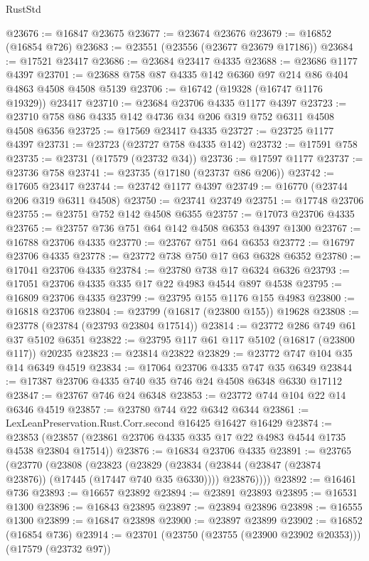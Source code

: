 \begin{lexlean}{RustStd}
\begin{coremodule}
@23676 := @16847 @23675
@23677 := @23674 @23676
@23679 := @16852 (@16854 @726)
@23683 := @23551 (@23556 (@23677 @23679 @17186))
@23684 := @17521 @23417
@23686 := @23684 @23417 @4335
@23688 := @23686 @1177 @4397
@23701 := @23688 @758 @87 @4335 @142 @6360 @97 @214 @86 @404 @4863 @4508 @4508 @5139
@23706 := @16742 (@19328 (@16747 @1176 @19329)) @23417
@23710 := @23684 @23706 @4335 @1177 @4397
@23723 := @23710 @758 @86 @4335 @142 @4736 @34 @206 @319 @752 @6311 @4508 @4508 @6356
@23725 := @17569 @23417 @4335
@23727 := @23725 @1177 @4397
@23731 := @23723 (@23727 @758 @4335 @142)
@23732 := @17591 @758
@23735 := @23731 (@17579 (@23732 @34))
@23736 := @17597 @1177
@23737 := @23736 @758
@23741 := @23735 (@17180 (@23737 @86 @206))
@23742 := @17605 @23417
@23744 := @23742 @1177 @4397
@23749 := @16770 (@23744 @206 @319 @6311 @4508)
@23750 := @23741 @23749
@23751 := @17748 @23706
@23755 := @23751 @752 @142 @4508 @6355
@23757 := @17073 @23706 @4335
@23765 := @23757 @736 @751 @64 @142 @4508 @6353 @4397 @1300
@23767 := @16788 @23706 @4335
@23770 := @23767 @751 @64 @6353
@23772 := @16797 @23706 @4335
@23778 := @23772 @738 @750 @17 @63 @6328 @6352
@23780 := @17041 @23706 @4335
@23784 := @23780 @738 @17 @6324 @6326
@23793 := @17051 @23706 @4335 @335 @17 @22 @4983 @4544 @897 @4538
@23795 := @16809 @23706 @4335
@23799 := @23795 @155 @1176 @155 @4983
@23800 := @16818 @23706
@23804 := @23799 (@16817 (@23800 @155)) @19628
@23808 := @23778 (@23784 (@23793 @23804 @17514))
@23814 := @23772 @286 @749 @61 @37 @5102 @6351
@23822 := @23795 @117 @61 @117 @5102 (@16817 (@23800 @117)) @20235
@23823 := @23814 @23822
@23829 := @23772 @747 @104 @35 @14 @6349 @4519
@23834 := @17064 @23706 @4335 @747 @35 @6349
@23844 := @17387 @23706 @4335 @740 @35 @746 @24 @4508 @6348 @6330 @17112
@23847 := @23767 @746 @24 @6348
@23853 := @23772 @744 @104 @22 @14 @6346 @4519
@23857 := @23780 @744 @22 @6342 @6344
@23861 := LexLeanPreservation.Rust.Corr.second @16425 @16427 @16429
@23874 := @23853 (@23857 (@23861 @23706 @4335 @335 @17 @22 @4983 @4544 @1735 @4538 @23804 @17514))
@23876 := @16834 @23706 @4335
@23891 := @23765
    (@23770
      (@23808
        (@23823
          (@23829
            (@23834 (@23844 (@23847 (@23874 @23876)) (@17445 (@17447 @740 @35 @6330))))
            @23876))))
@23892 := @16461 @736
@23893 := @16657 @23892
@23894 := @23891 @23893
@23895 := @16531 @1300
@23896 := @16843 @23895
@23897 := @23894 @23896
@23898 := @16555 @1300
@23899 := @16847 @23898
@23900 := @23897 @23899
@23902 := @16852 (@16854 @736)
@23914 := @23701
    (@23750 (@23755 (@23900 @23902 @20353)))
    (@17579 (@23732 @97))

\end{coremodule}
\end{lexlean}
